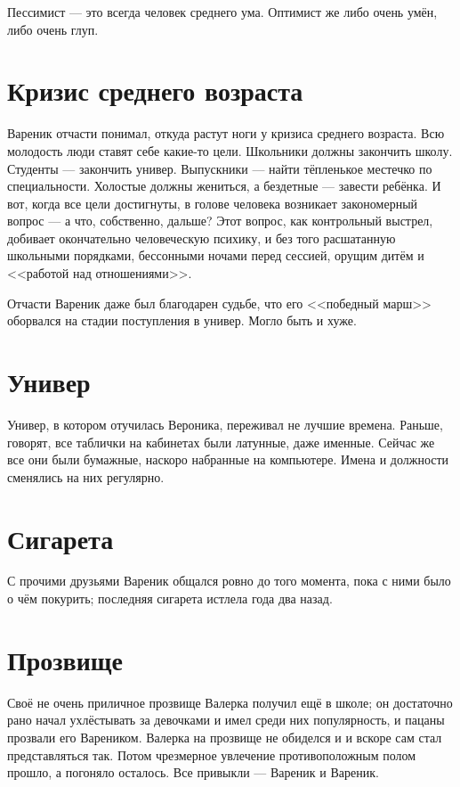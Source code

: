 \documentclass[a4paper,10pt,fleqn]{book}\usepackage{polyglossia}\setdefaultlanguage{english}\setotherlanguage{russian}\defaultfontfeatures{Ligatures=TeX,Mapping=tex-text} \usepackage{xcolor}\definecolor{lightgray}{HTML}{bbbbbb}\color{lightgray}\newcommand{\ml}[3]{\textcolor{black}{#3}}
\begin{document}
Пессимист --- это всегда человек среднего ума.
Оптимист же либо очень умён, либо очень глуп.

\section{Кризис среднего возраста}

Вареник отчасти понимал, откуда растут ноги у кризиса среднего возраста.
Всю молодость люди ставят себе какие-то цели.
Школьники должны закончить школу.
Студенты --- закончить универ.
Выпускники --- найти тёпленькое местечко по специальности.
Холостые должны жениться, а бездетные --- завести ребёнка.
И вот, когда все цели достигнуты, в голове человека возникает закономерный вопрос --- а что, собственно, дальше?
Этот вопрос, как контрольный выстрел, добивает окончательно человеческую психику, и без того расшатанную школьными порядками, бессонными ночами перед сессией, орущим дитём и <<работой над отношениями>>.

Отчасти Вареник даже был благодарен судьбе, что его <<победный марш>> оборвался на стадии поступления в универ.
Могло быть и хуже.

\section{Универ}

Универ, в котором отучилась Вероника, переживал не лучшие времена.
Раньше, говорят, все таблички на кабинетах были латунные, даже именные.
Сейчас же все они были бумажные, наскоро набранные на компьютере.
Имена и должности сменялись на них регулярно.

\section{Сигарета}

С прочими друзьями Вареник общался ровно до того момента, пока с ними было о чём покурить;
последняя сигарета истлела года два назад.

\section{Прозвище}

Своё не очень приличное прозвище Валерка получил ещё в школе;
он достаточно рано начал ухлёстывать за девочками и имел среди них популярность, и пацаны прозвали его Вареником.
Валерка на прозвище не обиделся и и вскоре сам стал представляться так.
Потом чрезмерное увлечение противоположным полом прошло, а погоняло осталось.
Все привыкли --- Вареник и Вареник.
\end{document}
